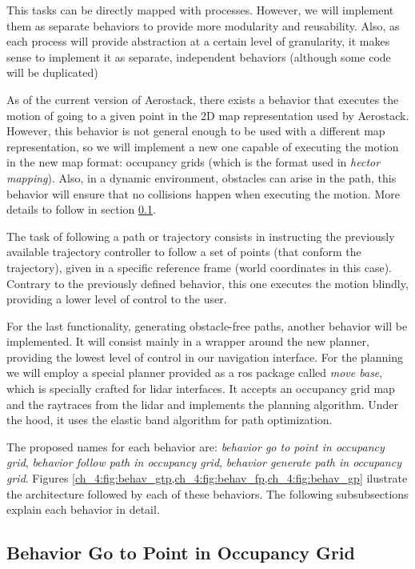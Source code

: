   This tasks can be directly mapped with processes. However, we will implement them as separate behaviors to provide more modularity and reusability. Also, as each process will provide abstraction at a certain level of granularity, it makes sense to implement it as separate, independent behaviors (although some code will be duplicated)

  As of the current version of Aerostack, there exists a behavior that executes the motion of going to a given point in the 2D map representation used by Aerostack. However, this behavior is not general enough to be used with a different map representation, so we will implement a new one capable of executing the motion in the new map format: occupancy grids (which is the format used in \textit{hector mapping}). Also, in a dynamic environment, obstacles can arise in the path, this behavior will ensure that no collisions happen when executing the motion. More details to follow in section \ref{ch_4:subsect:behav_gtp}.

  The task of following a path or trajectory consists in instructing the previously available trajectory controller to follow a set of points (that conform the trajectory), given in a specific reference frame (world coordinates in this case). Contrary to the previously defined behavior, this one executes the motion blindly, providing a lower level of control to the user.

  For the last functionality, generating obstacle-free paths, another behavior will be implemented. It will consist mainly in a wrapper around the new planner, providing the lowest level of control in our navigation interface. For the planning we will employ a special planner provided as a ros package called \textit{move base}, which is specially crafted for lidar interfaces. It accepts an occupancy grid map and the raytraces from the lidar and implements the planning algorithm. Under the hood, it uses the elastic band algorithm for path optimization.

  The proposed names for each behavior are: \textit{behavior go to point in occupancy grid}, \textit{behavior follow path in occupancy grid}, \textit{behavior generate path in occupancy grid}. Figures \cref{ch_4:fig:behav_gtp,ch_4:fig:behav_fp,ch_4:fig:behav_gp} ilustrate the architecture followed by each of these behaviors. The following subsubsections explain each behavior in detail.

\subsection{Behavior Go to Point in Occupancy Grid} \label{ch_4:subsect:behav_gtp}

